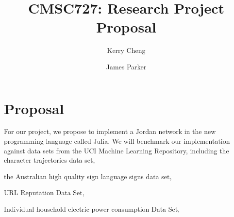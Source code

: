 \documentclass[12pt]{article}
\title{CMSC727: Research Project Proposal}
\author{Kerry Cheng \and James Parker}
\begin{document}
\maketitle

\section{Proposal}

For our project, we propose to implement a Jordan network in the new programming language called Julia. We will benchmark our implementation against data sets from the UCI Machine Learning Repository, including the character trajectories data set,

the Australian high quality sign language signs data set, 

URL Reputation Data Set,

Individual household electric power consumption Data Set,
\end{document}
